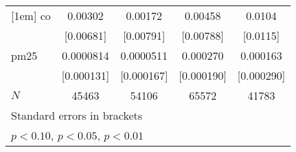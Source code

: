 \documentclass[11pt]{article}
\begin{document}
\begin{subappendices}
\begin{center}
{{\begin{tabular}{l*{4}{c}}
					[1em]
					co          &     0.00302         &     0.00172         &     0.00458         &      0.0104         \\
					&   [0.00681]         &   [0.00791]         &   [0.00788]         &    [0.0115]         \\
					[1em]
					pm25        &   0.0000814         &   0.0000511         &    0.000270         &    0.000163         \\
					&  [0.000131]         &  [0.000167]         &  [0.000190]         &  [0.000290]         \\
					\hline
					\(N\)       &       45463         &       54106         &       65572         &       41783         \\
					\hline\hline
					\multicolumn{5}{l}{\footnotesize Standard errors in brackets}\\
					\multicolumn{5}{l}{\footnotesize \sym{*} \(p<0.10\), \sym{**} \(p<0.05\), \sym{***} \(p<0.01\)}\\
				\end{tabular}
			}
				
			}
		\end{center}
		

\end{subappendices}
\end{document}
